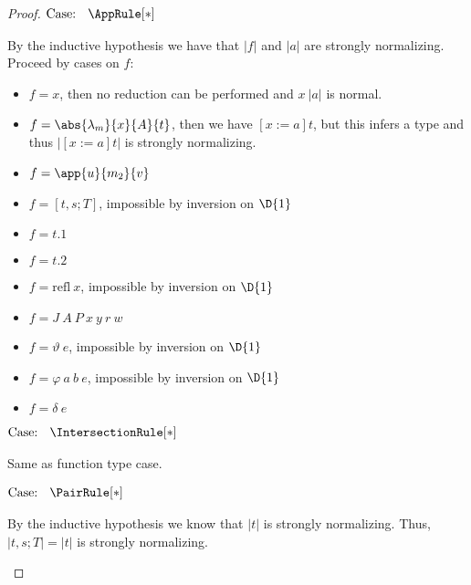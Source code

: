 \begin{proof}
    $\text{Case: }\begin{array}{c} \AppRule[*] \end{array}$
    \begin{proofcase}
        By the inductive hypothesis we have that $|f|$ and $|a|$ are strongly normalizing.
        Proceed by cases on $f$:
        \begin{itemize}
            \item {
                $f = x$, then no reduction can be performed and $x\ |a|$ is normal.
            }
            \item {
                $f = \abs{\lambda_m}{x}{A}{t}$, then we have $[x := a]t$, but this infers a type and thus $|[x := a]t|$ is strongly normalizing.
            }
            \item {
                $f = \app{u}{m_2}{v}$
            }
            \item {
                $f = [t, s; T]$, impossible by inversion on $\D{1}$
            }
            \item {
                $f = t.1$
            }
            \item {
                $f = t.2$
            }
            \item {
                $f = \text{refl}\ x$, impossible by inversion on $\D{1}$
            }
            \item {
                $f = J\ A\ P\ x\ y\ r\ w$
            }
            \item {
                $f = \vartheta\ e$, impossible by inversion on $\D{1}$
            }
            \item {
                $f = \varphi\ a\ b\ e$, impossible by inversion on $\D{1}$
            }
            \item {
                $f = \delta\ e$
            }
        \end{itemize}
    \end{proofcase}

    $\text{Case: }\begin{array}{c} \IntersectionRule[*] \end{array}$
    \begin{proofcase}
        Same as function type case.
    \end{proofcase}

    $\text{Case: }\begin{array}{c} \PairRule[*] \end{array}$
    \begin{proofcase}
        By the inductive hypothesis we know that $|t|$ is strongly normalizing.
        Thus, $|t, s; T| = |t|$ is strongly normalizing.
    \end{proofcase}


\end{proof}
